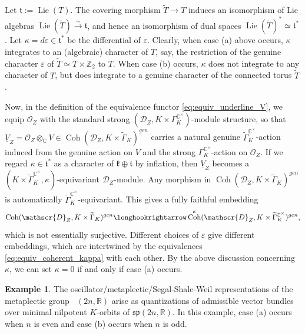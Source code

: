 \documentclass[11pt, a4paper]{amsart}
\newcommand{\C}{\mathbb{C}}
\newcommand{\Z}{\mathbb{Z}}
\newcommand{\fk}{\mathfrak{k}}
\newcommand{\ft}{\mathfrak{t}}
\newcommand{\fsp}{\mathfrak{sp}}
\newcommand{\sD}{\mathscr{D}}
\newcommand{\tGamma}{\widetilde{\Gamma}}
\DeclareMathOperator{\Lie}{Lie}
\DeclareMathOperator{\Coh}{Coh}
\DeclareMathOperator{\Mp}{\widetilde{Sp}}
\newcommand{\R}{\mathbb{R}}
\newcommand{\cm}{\C^\times}
\newcommand{\OO}{\mathcal{O}}
\theoremstyle{definition}
\newtheorem{Ex}[Thm]{Example}
\numberwithin{equation}{section}
\begin{document}

Let $\ft := \Lie(T)$. The covering morphism $\widetilde{T} \to T$ induces an isomorphism of Lie algebras $\Lie(\widetilde{T}) \xrightarrow{\sim} \ft$, and hence an isomorphism of dual spaces $\Lie(\widetilde{T})^* \simeq \ft^*$. Let $\kappa = d \varepsilon \in \ft^*$ be the differential of $\varepsilon$. Clearly, when case (a) above occurs, $\kappa$ integrates to an (algebraic) character of $T$, say, the restriction of the genuine character $\varepsilon$ of $\widetilde{T} \simeq T \times \Z_2$ to $T$. When case (b) occurs, $\kappa$ does not integrate to any character of $T$, but does integrate to a genuine character of the connected torus $\widetilde{T}$.

Now, in the definition of the equivalence functor \eqref{eq:equiv_underline_V}, we equip $\OO_Z$ with the standard strong $(\sD_Z, K \times \Gamma_K^{\cm})$-module structure, so that $\underline{V}_Z = \OO_Z \otimes_\C V \in \Coh(\sD_Z, K \times \tGamma_K)^{gen}$ carries a natural genuine $\tGamma_K^{\cm}$-action induced from the genuine action on $V$ and the strong $\Gamma_K^{\cm}$-action on $\OO_Z$. If we regard $\kappa \in \ft^*$ as a character of $\fk \oplus \ft$ by inflation, then $\underline{V}_Z$ becomes a $(K \times \tGamma_K^{\cm}, \kappa)$-equivariant $\sD_Z$-module. Any morphism in $\Coh(\sD_Z, K \times \tGamma_K)^{gen}$ is automatically $\tGamma_K^{\cm}$-equivariant. %
This gives a fully faithful embedding 
\[ \Coh(\sD_Z, K \times \tGamma_K)^{gen} \longhookrightarrow \Coh^{\kappa}(\sD_Z, K \times \tGamma_K^{\cm})^{gen}, \]
which is not essentially surjective. Different choices of $\varepsilon$ give different embeddings, which are intertwined by the equivalences \eqref{eq:equiv_coherent_kappa} with each other. By the above discussion concerning $\kappa$, we can set $\kappa = 0$ if and only if case (a) occurs.

\begin{Ex} \label{ex:metaplectic_rep} 
	The oscillator/metaplectic/Segal-Shale-Weil representations of the metaplectic group $\Mp(2n,\R)$ arise as quantizations of admissible vector bundles over minimal nilpotent $K$-orbits of $\fsp(2n,\R)$. In this example, case (a) occurs when $n$ is even and case (b) occurs when $n$ is odd. 
\end{Ex}
\end{document}
